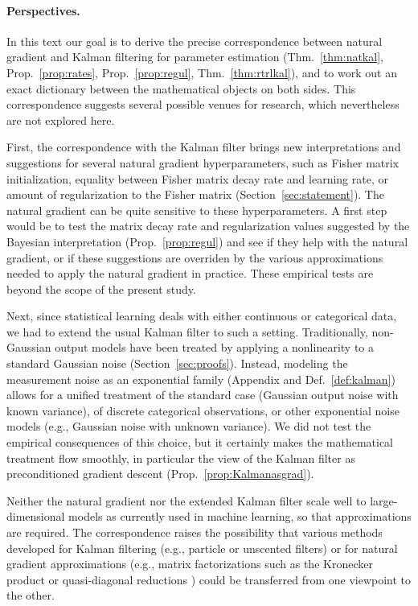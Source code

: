 \documentclass[11pt,a4paper]{article}
\newcommand{\1}{\mathbbm{1}}
\theoremstyle{yannthm}
\theoremstyle{yannthm2}
\numberwithin{equation}{section}
\begin{document}
\paragraph*{Perspectives.} In this text our goal is to derive the precise
correspondence between natural gradient and Kalman filtering for
parameter estimation (Thm.~\ref{thm:natkal}, Prop.~\ref{prop:rates},
Prop.~\ref{prop:regul}, Thm.~\ref{thm:rtrlkal}), and to work
out an exact dictionary between the mathematical objects on both sides.
This correspondence suggests several possible
venues for research, which nevertheless are not explored here.

First, the correspondence with the Kalman filter brings new
interpretations and suggestions for several natural gradient
hyperparameters, such as Fisher matrix initialization, equality between
Fisher matrix decay rate and learning rate, or amount of regularization
to the Fisher matrix (Section~\ref{sec:statement}). The natural gradient
can be quite sensitive to these hyperparameters. A first step would be to
test the matrix decay rate and regularization values suggested by the
Bayesian interpretation (Prop.~\ref{prop:regul}) and see if they help
with the natural gradient, or if these suggestions are overriden by the
various approximations needed to apply the natural gradient in practice.
These empirical tests are beyond the scope of the present study.

Next, since statistical learning deals with either continuous or
categorical data, we had to extend the usual Kalman filter to such a
setting. Traditionally, non-Gaussian
output models have been treated by applying a nonlinearity to a standard
Gaussian noise (Section~\ref{sec:proofs}). Instead, modeling the measurement noise as an exponential family
(Appendix and Def.~\ref{def:kalman}) allows for a unified treatment of
the standard case (Gaussian output noise with known variance), of
discrete categorical observations, or other exponential noise models
(e.g., Gaussian noise with unknown variance). We did not test the
empirical consequences of this choice, but it certainly makes the
mathematical treatment flow smoothly, in particular the view of the
Kalman filter as preconditioned gradient descent
(Prop.~\ref{prop:Kalmanasgrad}).

Neither the natural gradient nor the extended Kalman filter scale well to
large-dimensional models as currently used in machine learning, so that
approximations are required.  The correspondence raises the possibility
that various methods developed for Kalman filtering (e.g., particle or
unscented filters) or for natural gradient approximations (e.g., matrix
factorizations such as the Kronecker product \cite{martens2015optimizing}
or quasi-diagonal reductions \cite{gradnn,riemaNN}) could be transferred from one viewpoint to the other.
\end{document}
